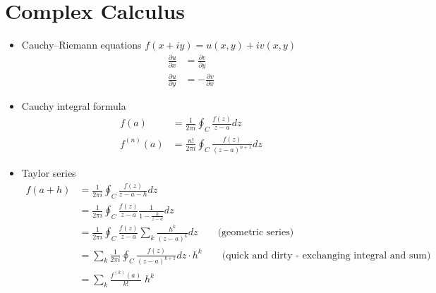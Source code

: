 \documentclass[10pt,a4paper]{book}
\theoremstyle{definition}
\begin{document}
\section{Complex Calculus}
\begin{itemize}
\item Cauchy–Riemann equations $f(x+iy)=u(x,y)+iv(x,y)$
\begin{align}
\frac{\partial u}{\partial x}&=\frac{\partial v}{\partial y}\\
\frac{\partial u}{\partial y}&=-\frac{\partial v}{\partial x}
\end{align}
\item Cauchy integral formula
\begin{align}
f(a)&=\frac{1}{2\pi i}\oint_C\frac{f(z)}{z-a}dz\\
f^{(n)}(a)&=\frac{n!}{2\pi i}\oint_C\frac{f(z)}{(z-a)^{n+1}}dz
\end{align}
\item Taylor series
\begin{align}
f(a+h)
&=\frac{1}{2\pi i}\oint_C\frac{f(z)}{z-a-h}dz\\
&=\frac{1}{2\pi i}\oint_C\frac{f(z)}{z-a}\frac{1}{1-\frac{h}{z-a}}dz\\
&=\frac{1}{2\pi i}\oint_C\frac{f(z)}{z-a}\sum_k\frac{h^k}{(z-a)^k}dz\qquad\text{(geometric series)}\\
&=\sum_k \frac{1}{2\pi i}\oint_C\frac{f(z)}{(z-a)^{k+1}}dz\cdot h^k\qquad\text{(quick and dirty - exchanging integral and sum)}\\
&=\sum_k \frac{f^{(k)}(a)}{k!}\; h^k
\end{align}

\end{itemize}
\end{document}
